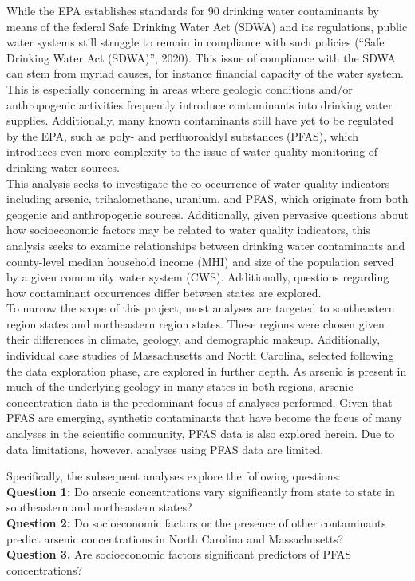 \documentclass[12pt,]{article}
\begin{document}
While the EPA establishes standards for 90 drinking water contaminants
by means of the federal Safe Drinking Water Act (SDWA) and its
regulations, public water systems still struggle to remain in compliance
with such policies (``Safe Drinking Water Act (SDWA)'', 2020). This
issue of compliance with the SDWA can stem from myriad causes, for
instance financial capacity of the water system. This is especially
concerning in areas where geologic conditions and/or anthropogenic
activities frequently introduce contaminants into drinking water
supplies. Additionally, many known contaminants still have yet to be
regulated by the EPA, such as poly- and perfluoroaklyl substances
(PFAS), which introduces even more complexity to the issue of water
quality monitoring of drinking water sources.\\
This analysis seeks to investigate the co-occurrence of water quality
indicators including arsenic, trihalomethane, uranium, and PFAS, which
originate from both geogenic and anthropogenic sources. Additionally,
given pervasive questions about how socioeconomic factors may be related
to water quality indicators, this analysis seeks to examine
relationships between drinking water contaminants and county-level
median household income (MHI) and size of the population served by a
given community water system (CWS). Additionally, questions regarding
how contaminant occurrences differ between states are explored.\\
To narrow the scope of this project, most analyses are targeted to
southeastern region states and northeastern region states. These regions
were chosen given their differences in climate, geology, and demographic
makeup. Additionally, individual case studies of Massachusetts and North
Carolina, selected following the data exploration phase, are explored in
further depth. As arsenic is present in much of the underlying geology
in many states in both regions, arsenic concentration data is the
predominant focus of analyses performed. Given that PFAS are emerging,
synthetic contaminants that have become the focus of many analyses in
the scientific community, PFAS data is also explored herein. Due to data
limitations, however, analyses using PFAS data are limited.

Specifically, the subsequent analyses explore the following questions:\\
\textbf{Question 1:} Do arsenic concentrations vary significantly from
state to state in southeastern and northeastern states?\\
\textbf{Question 2:} Do socioeconomic factors or the presence of other
contaminants predict arsenic concentrations in North Carolina and
Massachusetts?\\
\textbf{Question 3.} Are socioeconomic factors significant predictors of
PFAS concentrations?
\end{document}
